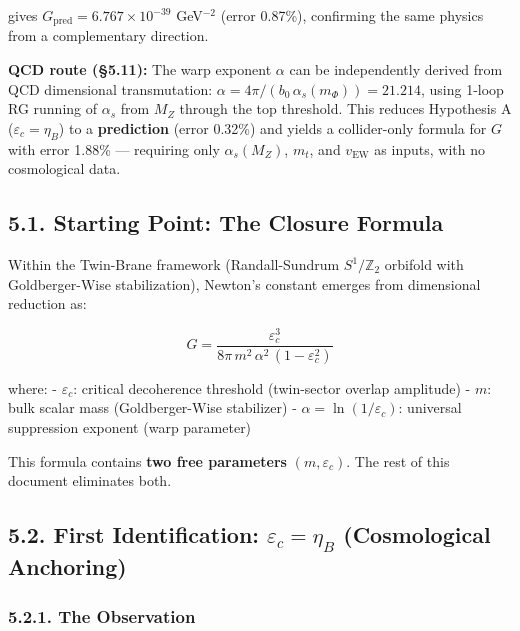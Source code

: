\documentclass[
  11pt,
]{article}
\begin{document}
gives \(G_{\text{pred}} = 6.767 \times 10^{-39}\) GeV\(^{-2}\) (error
0.87\%), confirming the same physics from a complementary direction.

\textbf{QCD route (§5.11):} The warp exponent \(\alpha\) can be
independently derived from QCD dimensional transmutation:
\(\alpha = 4\pi/(b_0\,\alpha_s(m_\Phi)) = 21.214\), using 1-loop RG
running of \(\alpha_s\) from \(M_Z\) through the top threshold. This
reduces Hypothesis A (\(\varepsilon_c = \eta_B\)) to a
\textbf{prediction} (error 0.32\%) and yields a collider-only formula
for \(G\) with error 1.88\% --- requiring only \(\alpha_s(M_Z)\),
\(m_t\), and \(v_{\text{EW}}\) as inputs, with no cosmological data.

\bigskip

\hypertarget{starting-point-the-closure-formula}{%
\subsection{5.1. Starting Point: The Closure
Formula}\label{starting-point-the-closure-formula}}

Within the Twin-Brane framework (Randall-Sundrum \(S^1/\mathbb{Z}_2\)
orbifold with Goldberger-Wise stabilization), Newton's constant emerges
from dimensional reduction as:

\[G = \frac{\varepsilon_c^3}{8\pi\,m^2\,\alpha^2\,(1 - \varepsilon_c^2)} \tag{208}\]

where: - \(\varepsilon_c\): critical decoherence threshold (twin-sector
overlap amplitude) - \(m\): bulk scalar mass (Goldberger-Wise
stabilizer) - \(\alpha = \ln(1/\varepsilon_c)\): universal suppression
exponent (warp parameter)

This formula contains \textbf{two free parameters}
\((m, \varepsilon_c)\). The rest of this document eliminates both.

\bigskip

\hypertarget{first-identification-varepsilon_c-eta_b-cosmological-anchoring}{%
\subsection{\texorpdfstring{5.2. First Identification:
\(\varepsilon_c = \eta_B\) (Cosmological
Anchoring)}{5.2. First Identification: \textbackslash varepsilon\_c = \textbackslash eta\_B (Cosmological Anchoring)}}\label{first-identification-varepsilon_c-eta_b-cosmological-anchoring}}

\hypertarget{the-observation}{%
\subsubsection{5.2.1. The Observation}\label{the-observation}}
\end{document}
